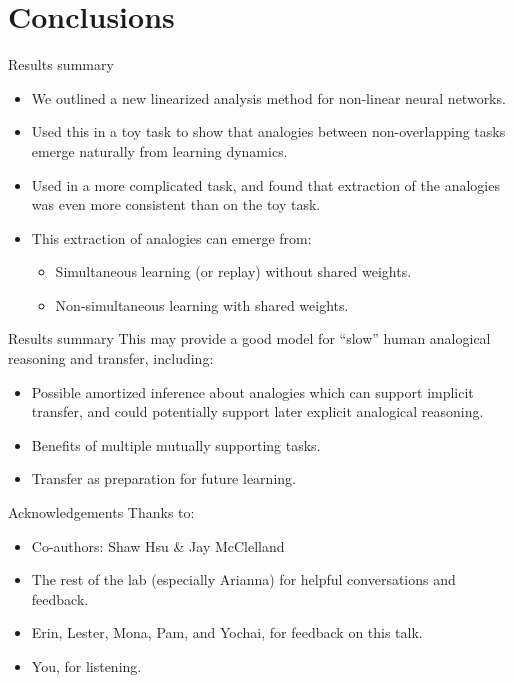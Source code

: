 \documentclass{beamer}
\begin{document}
\section{Conclusions}
\begin{frame}{Results summary}
\begin{itemize}
    \item<1-> We outlined a new linearized analysis method for non-linear neural networks. 
    \item<2-> Used this in a toy task to show that analogies between non-overlapping tasks emerge naturally from learning dynamics. 
    \item<3-> Used in a more complicated task, and found that extraction of the analogies was even more consistent than on the toy task. 
    \item<4-> This extraction of analogies can emerge from:
    \begin{itemize}
	\item<5-> Simultaneous learning (or replay) without shared weights. 
	\item<6-> Non-simultaneous learning with shared weights.
    \end{itemize}
\end{itemize}
\end{frame}

\begin{frame}{Results summary}
This may provide a good model for ``slow'' human analogical reasoning and transfer, including:
\begin{itemize}
    \item<2-> Possible amortized inference about analogies which can support implicit transfer, and could potentially support later explicit analogical reasoning.
    \item<3-> Benefits of multiple mutually supporting tasks.
    \item<4-> Transfer as preparation for future learning.
\end{itemize}
\end{frame}

\begin{frame}{Acknowledgements}
Thanks to:
\begin{itemize}
    \item Co-authors: Shaw Hsu \& Jay McClelland
    \item The rest of the lab (especially Arianna) for helpful conversations and feedback. 
    \item Erin, Lester, Mona, Pam, and Yochai, for feedback on this talk.
    \item You, for listening.
\end{itemize}
\end{frame}
\end{document}
